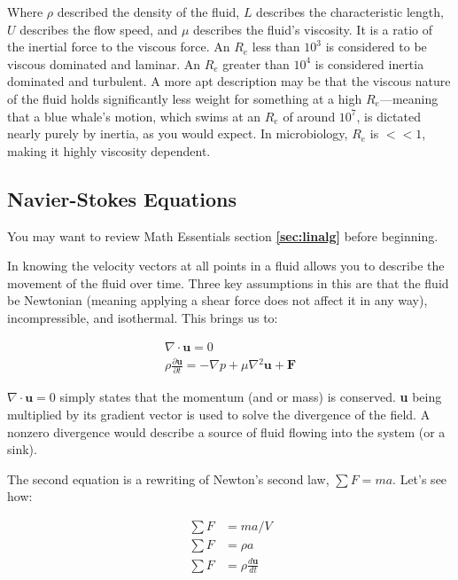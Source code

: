 \documentclass[12pt]{report}
\begin{document}
Where $\rho$ described the density of the fluid, $L$ describes the characteristic length, $U$ describes the flow speed, and $\mu$ describes the fluid's viscosity. It is a ratio of the inertial force to the viscous force. An $R_e$ less than $10^3$ is considered to be viscous dominated and laminar. An $R_e$ greater than $10^4$ is considered inertia dominated and turbulent. A more apt description may be that the viscous nature of the fluid holds significantly less weight for something at a high $R_e$---meaning that a blue whale's motion, which swims at an $R_e$ of around $10^7$, is dictated nearly purely by inertia, as you would expect. In microbiology, $R_e$ is $<< 1$, making it highly viscosity dependent. 

\subsection{Navier-Stokes Equations}

You may want to review Math Essentials section \textbf{\ref{sec:linalg}} before beginning.\newline

In knowing the velocity vectors at all points in a fluid allows you to describe the movement of the fluid over time. Three key assumptions in this are that the fluid be Newtonian (meaning applying a shear force does not affect it in any way), incompressible, and isothermal. This brings us to:

\begin{equation} \label{NS1}
\begin{split}
\nabla \cdot \mathbf{u} = 0 \\
\rho \frac{\partial \mathbf{u}}{\partial t}= -\nabla p + \mu \nabla{}^2\mathbf{u} + \mathbf{F} 
\end{split}
\end{equation}

$\nabla \cdot \mathbf{u} = 0$ simply states that the momentum (and or mass) is conserved. \textbf{u} being multiplied by its gradient vector is used to solve the divergence of the field. A nonzero divergence would describe a source of fluid flowing into the system (or a sink).\newline

The second equation is a rewriting of Newton's second law, $\sum F = ma$. Let's see how: 

\begin{equation} \label{NSderive1}
\begin{split}
\sum F & = ma / V \\
\sum F & = \rho a \\
\sum F & = \rho \frac{d\mathbf{u}}{dt} \\
\end{split}
\end{equation}
\end{document}
